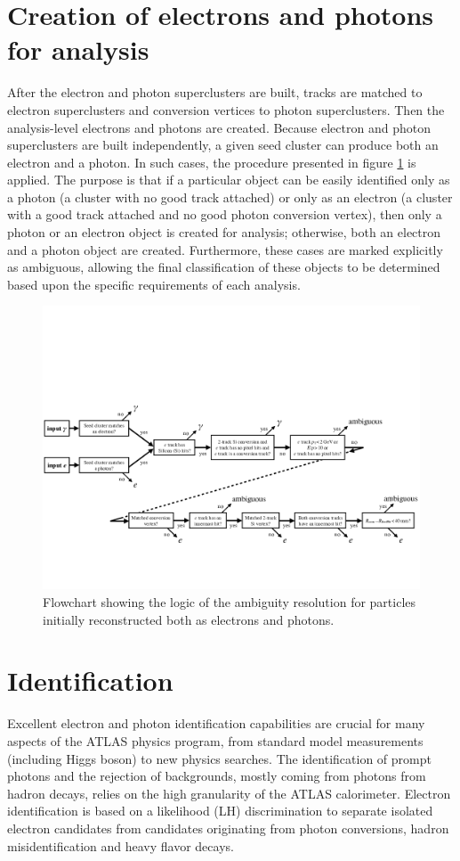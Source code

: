 \documentclass[a4paper, oneside]{book}
\begin{document}
		\section{Creation of electrons and photons for analysis}
		\cite{El ph reco}After the electron and photon superclusters are built, tracks are matched to electron superclusters and conversion vertices to photon superclusters. Then the analysis-level
		electrons and photons are created. Because electron and photon superclusters are built independently, a given seed cluster can produce both an electron and a photon. In such cases, the procedure
		presented in figure \ref{fig:el_ph_analisi} is applied. The purpose is that if a particular object can be easily identified only as a photon (a cluster with no good track attached) or only as an electron (a cluster with a good track attached and no good photon conversion vertex), then only a photon or an electron object is created for analysis; otherwise, both an electron and a photon object are created. Furthermore, these cases are marked explicitly as ambiguous, allowing the final classification of these objects to be determined based upon the specific requirements of each analysis.
		\begin{figure}
			\centering
			\includegraphics[width=0.45\textheight]{tesi_images/el_ph_analisi.png}
			\caption{Flowchart showing the logic of the ambiguity resolution for particles initially reconstructed both as electrons and photons.}
			\label{fig:el_ph_analisi}
		\end{figure}
	
		\section{Identification}
		\cite{Identification}Excellent electron and photon identification capabilities are crucial for many aspects of the ATLAS physics program, from standard model measurements (including Higgs boson) to new physics searches. The identification of prompt photons and the rejection of backgrounds, mostly coming from photons from hadron decays, relies on the high granularity of the ATLAS calorimeter. Electron identification is based on a likelihood (LH) discrimination to separate isolated electron candidates from candidates originating from photon conversions, hadron misidentification and heavy flavor decays. 
\end{document}
